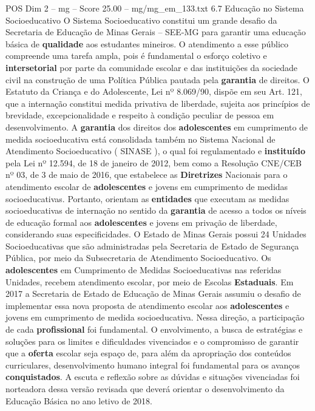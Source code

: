 \begin{textsample}{POS Dim 2 – mg – Score 25.00 – mg/mg\_em\_133.txt}  \label{ex:f2_pos_197}
6.7 Educação no Sistema Socioeducativo O Sistema Socioeducativo constitui um grande desafio da Secretaria de Educação de Minas Gerais – SEE-MG para garantir uma educação básica de \textbf{qualidade} aos estudantes mineiros.
O atendimento a esse público compreende uma tarefa ampla, pois é fundamental o esforço coletivo e \textbf{intersetorial} por parte da comunidade escolar e das instituições da sociedade civil na construção de uma Política Pública pautada pela \textbf{garantia} de direitos.
O Estatuto da Criança e do Adolescente, Lei nº 8.069/90, dispõe em seu Art. 121, que a internação constitui medida privativa de liberdade, sujeita aos princípios de brevidade, excepcionalidade e respeito à condição peculiar de pessoa em desenvolvimento.
A \textbf{garantia} dos direitos dos \textbf{adolescentes} em cumprimento de medida socioeducativa está consolidada também no Sistema Nacional de Atendimento Socioeducativo ( SINASE ), o qual foi regulamentado e \textbf{instituído} pela Lei nº 12.594, de 18 de janeiro de 2012, bem como a Resolução CNE/CEB nº 03, de 3 de maio de 2016, que estabelece as \textbf{Diretrizes} Nacionais para o atendimento escolar de \textbf{adolescentes} e jovens em cumprimento de medidas socioeducativas.
Portanto, orientam as \textbf{entidades} que executam as medidas socioeducativas de internação no sentido da \textbf{garantia} de acesso a todos os níveis de educação formal aos \textbf{adolescentes} e jovens em privação de liberdade, considerando suas especificidades.
O Estado de Minas Gerais possui 24 Unidades Socioeducativas que são administradas pela Secretaria de Estado de Segurança Pública, por meio da Subsecretaria de Atendimento Socioeducativo.
Os \textbf{adolescentes} em Cumprimento de Medidas Socioeducativas nas referidas Unidades, recebem atendimento escolar, por meio de Escolas \textbf{Estaduais}.
Em 2017 a Secretaria de Estado de Educação de Minas Gerais assumiu o desafio de implementar essa nova proposta de atendimento escolar aos \textbf{adolescentes} e jovens em cumprimento de medida socioeducativa.
Nessa direção, a participação de cada \textbf{profissional} foi fundamental.
O envolvimento, a busca de estratégias e soluções para os limites e dificuldades vivenciados e o compromisso de garantir que a \textbf{oferta} escolar seja espaço de, para além da apropriação dos conteúdos curriculares, desenvolvimento humano integral foi fundamental para os avanços \textbf{conquistados}.
A escuta e reflexão sobre as dúvidas e situações vivenciadas foi norteadora dessa versão revisada que deverá orientar o desenvolvimento da Educação Básica no ano letivo de 2018.

\end{textsample}
